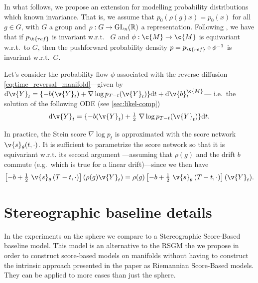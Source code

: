 In what follows, we propose an extension for modelling probability distributions which known invariance.
That is, we assume that $p_0\left(\rho(g) x\right) = p_0(x)$ for all $g \in G$, with $G$ a group and $\rho: G \rightarrow \text{GL}_n(\mathbb{R})$ a representation.
Following \textcite{kohler2020equivariant}, we have that if $p_{\t{ref}}$ is invariant w.r.t.
\ $G$ and $\phi: \c{M} \rightarrow \c{M}$ is equivariant w.r.t.\ to $G$, then the pushforward probability density $p=p_{\t{ref}}\circ\phi^{-1}$ is invariant w.r.t.\ $G$.

Let's consider the probability flow $\phi$ associated with the reverse diffusion \eqref{eq:time_reversal_manifold}---given by $\mathrm{d} \v{Y}_t = \{-b(\v{Y}_t) + \nabla \log p_{T-t}(\v{Y}_t)\} \mathrm{d} t + \mathrm{d} \v{b}_t^\c{M}$--- i.e.\ the solution of the following ODE (see \cref{sec:likel-comp}) \begin{equation} \mathrm{d} \v{Y}_t = \{-b(\v{Y}_t) +\tfrac{1}{2}~ \nabla \log p_{T-t}(\v{Y}_t)\} \mathrm{d} t.
\end{equation}

In practice, the Stein score $\nabla \log p_{t}$ is approximated with the score network $\v{s}_\theta(t, \cdot)$.
It is sufficient to parametrize the score network so that it is equivariant w.r.t.
its second argument ---assuming that $\rho(g)$ and the drift $b$ commute (e.g.\ which is true for a linear drift)---since we then have \begin{align} \left[- b + \tfrac{1}{2}~ \v{s}_\theta\left(T - t, \cdot \right) \right] \left(\rho(g) \v{Y}_t \right) = \rho(g) \left[- b + \tfrac{1}{2}~ \v{s}_\theta\left(T - t, \cdot\right)\right] (\v{Y}_t).
\end{align}

\section{Stereographic baseline details}
\label{sec:stereo_exp}

In the experiments on the sphere we compare to a Stereographic Score-Based baseline model.
This model is an alternative to the RSGM the we propose in order to construct score-based models on manifolds without having to construct the intrinsic approach presented in the paper as Riemannian Score-Based models.
They can be applied to more cases than just the sphere.

